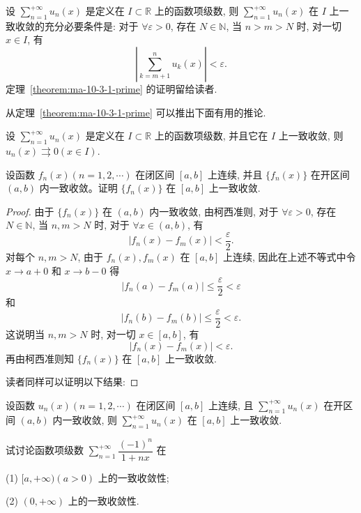 \begin{theorem}[{柯西准则}]\label{theorem:ma-10-3-1-prime}
设 $\sum\limits_{n=1}^{+\infty}u_n(x)$ 是定义在 $I\subset\mathbb R$ 上的函数项级数, 则 $\sum\limits_{n=1}^{+\infty}u_n(x)$ 在 $I$ 上一致收敛的充分必要条件是: 对于 $\forall\varepsilon>0$, 存在 $N\in\mathbb N$, 当 $n>m>N$ 时, 对一切 $x\in I$, 有
\[
  \left|\sum_{k=m+1}^n u_k(x)\right|<\varepsilon.
\]
定理~\ref{theorem:ma-10-3-1-prime} 的证明留给读者.
\end{theorem}

从定理~\ref{theorem:ma-10-3-1-prime} 可以推出下面有用的推论.

\begin{corollary}\label{corollary:ma-10-source-17}
设 $\sum\limits_{n=1}^{+\infty}u_n(x)$ 是定义在 $I\subset\mathbb R$ 上的函数项级数, 并且它在 $I$ 上一致收敛, 则 $u_n(x)\rightrightarrows0(x\in I)$.
\end{corollary}


\begin{example}\label{example:ma-10-3-1}
设函数 $f_n(x)(n=1,2,\cdots)$ 在闭区间 $[a,b]$ 上连续, 并且 $\{f_n(x)\}$ 在开区间 $(a,b)$ 内一致收敛。证明 $\{f_n(x)\}$ 在 $[a,b]$ 上一致收敛.
\end{example}


\begin{proof}
由于 $\{f_n(x)\}$ 在 $(a,b)$ 内一致收敛, 由柯西准则, 对于 $\forall\varepsilon>0$, 存在 $N\in\mathbb N$, 当 $n,m>N$ 时, 对于 $\forall x\in(a,b)$, 有
\[
  |f_n(x)-f_m(x)|<\frac\varepsilon2.
\]
对每个 $n,m>N$, 由于 $f_n(x),f_m(x)$ 在 $[a,b]$ 上连续, 因此在上述不等式中令 $x\to a+0$ 和 $x\to b-0$ 得
\[
  |f_n(a)-f_m(a)|\leq\frac\varepsilon2<\varepsilon
\]
和
\[
  |f_n(b)-f_m(b)|\leq\frac\varepsilon2<\varepsilon.
\]
这说明当 $n,m>N$ 时, 对一切 $x\in[a,b]$, 有
\[
  |f_n(x)-f_m(x)|<\varepsilon.
\]
再由柯西准则知 $\{f_n(x)\}$ 在 $[a,b]$ 上一致收敛.

读者同样可以证明以下结果:
\end{proof}


\begin{example}\label{example:ma-10-3-1-prime}
设函数 $u_n(x)(n=1,2,\cdots)$ 在闭区间 $[a,b]$ 上连续, 且 $\sum\limits_{n=1}^{+\infty}u_n(x)$ 在开区间 $(a,b)$ 内一致收敛, 则 $\sum\limits_{n=1}^{+\infty}u_n(x)$ 在 $[a,b]$ 上一致收敛.
\end{example}


\begin{example}\label{example:ma-10-3-2}
试讨论函数项级数 $\sum\limits_{n=1}^{+\infty}\dfrac{(-1)^n}{1+nx}$ 在

(1) $[a,+\infty)(a>0)$ 上的一致收敛性;

(2) $(0,+\infty)$ 上的一致收敛性.
\end{example}


